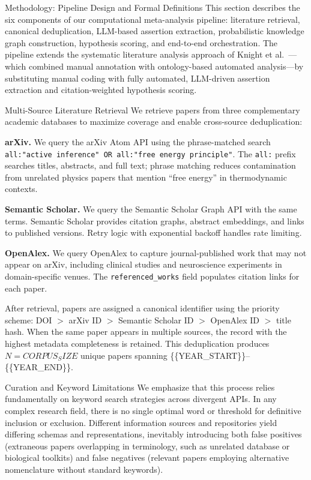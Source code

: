 \documentclass[
  ignorenonframetext,
]{beamer}
\author{\texorpdfstring{}{}}
\date{}
\begin{document}
\begin{frame}[fragile]{Methodology: Pipeline Design and Formal
Definitions}
\protect{}\label{methodology-pipeline-design-and-formal-definitions}
This section describes the six components of our computational
meta-analysis pipeline: literature retrieval, canonical deduplication,
LLM-based assertion extraction, probabilistic knowledge graph
construction, hypothesis scoring, and end-to-end orchestration. The
pipeline extends the systematic literature analysis approach of Knight
et al.~\citep{knight2022fep}---which combined manual annotation with
ontology-based automated analysis---by substituting manual coding with
fully automated, LLM-driven assertion extraction and citation-weighted
hypothesis scoring.

\begin{block}{Multi-Source Literature Retrieval}
\protect{}\label{multi-source-literature-retrieval}
We retrieve papers from three complementary academic databases to
maximize coverage and enable cross-source deduplication:

\textbf{arXiv.} We query the arXiv Atom API using the phrase-matched
search
\texttt{all:"active\ inference"\ OR\ all:"free\ energy\ principle"}. The
\texttt{all:} prefix searches titles, abstracts, and full text; phrase
matching reduces contamination from unrelated physics papers that
mention ``free energy'' in thermodynamic contexts.

\textbf{Semantic Scholar.} We query the Semantic Scholar Graph API
\citep{kinney2023semantic} with the same terms. Semantic Scholar
provides citation graphs, abstract embeddings, and links to published
versions. Retry logic with exponential backoff handles rate limiting.

\textbf{OpenAlex.} We query OpenAlex \citep{priem2022openalex} to
capture journal-published work that may not appear on arXiv, including
clinical studies and neuroscience experiments in domain-specific venues.
The \texttt{referenced\_works} field populates citation links for each
paper.

After retrieval, papers are assigned a canonical identifier using the
priority scheme: DOI \(>\) arXiv ID \(>\) Semantic Scholar ID \(>\)
OpenAlex ID \(>\) title hash. When the same paper appears in multiple
sources, the record with the highest metadata completeness is retained.
This deduplication produces \(N = {{CORPUS_SIZE}}\) unique papers
spanning \{\{YEAR\_START\}\}--\{\{YEAR\_END\}\}.

\begin{block}{Curation and Keyword Limitations}
\protect{}\label{curation-and-keyword-limitations}
We emphasize that this process relies fundamentally on keyword search
strategies across divergent APIs. In any complex research field, there
is no single optimal word or threshold for definitive inclusion or
exclusion. Different information sources and repositories yield
differing schemas and representations, inevitably introducing both false
positives (extraneous papers overlapping in terminology, such as
unrelated database or biological toolkits) and false negatives (relevant
papers employing alternative nomenclature without standard keywords).


\end{block}
\end{block}
\end{frame}
\end{document}
